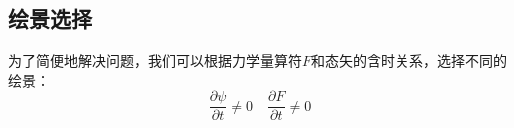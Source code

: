 \subsection{绘景选择}
为了简便地解决问题，我们可以根据力学量算符$F$和态矢$$的含时关系，选择不同的绘景：
\begin{equation}
\frac{\partial \psi}{\partial t}\neq 0 \quad \frac{\partial F}{\partial t}\neq 0 
\end{equation}

